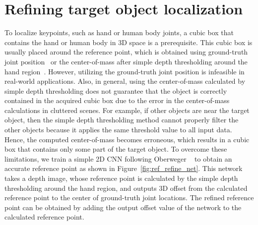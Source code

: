 \section{Refining target object localization}
\label{refineRefPoint_Section}

To localize keypoints, such as hand or human body joints, a cubic box that contains the hand or human body in 3D space is a prerequisite. This cubic box is usually placed around the reference point, which is obtained using ground-truth joint position~\cite{oberweger2015hands,oberweger2015training,zhou2016model} or the center-of-mass after simple depth thresholding around the hand region~\cite{guo2017ren,guo2017towards,chen2017pose}. However, utilizing the ground-truth joint position is infeasible in real-world applications. Also, in general, using the center-of-mass calculated by simple depth thresholding does not guarantee that the object is correctly contained in the acquired cubic box due to the error in the center-of-mass calculations in cluttered scenes. For example, if other objects are near the target object, then the simple depth thresholding method cannot properly filter the other objects because it applies the same threshold value to all input data. Hence, the computed center-of-mass becomes erroneous, which results in a cubic box that contains only some part of the target object. To overcome these limitations, we train a simple 2D CNN following Oberweger \etal~\cite{Oberweger_2017_ICCV_Workshops} to obtain an accurate reference point as shown in Figure~\ref{fig:ref_refine_net}. This network takes a depth image, whose reference point is calculated by the simple depth thresholding around the hand region, and outputs 3D offset from the calculated reference point to the center of ground-truth joint locations. The refined reference point can be obtained by adding the output offset value of the network to the calculated reference point.